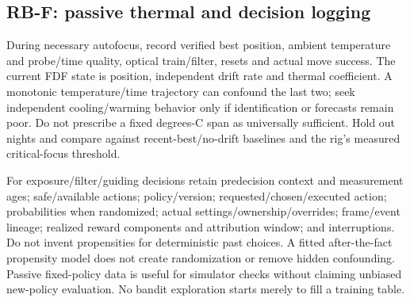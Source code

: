 \documentclass[11pt,a4paper]{article}
\begin{document}
\subsection{RB-F: passive thermal and decision logging}
During necessary autofocus, record verified best position, ambient temperature
and probe/time quality, optical train/filter, resets and actual move success.
The current FDF state is position, independent drift rate and thermal
coefficient. A monotonic temperature/time trajectory can confound the last two;
seek independent cooling/warming behavior only if identification or forecasts
remain poor. Do not prescribe a fixed degrees-C span as universally sufficient.
Hold out nights and compare against recent-best/no-drift baselines and the
rig's measured critical-focus threshold.

For exposure/filter/guiding decisions retain predecision context and measurement
ages; safe/available actions; policy/version; requested/chosen/executed action;
probabilities when randomized; actual settings/ownership/overrides; frame/event
lineage; realized reward components and attribution window; and interruptions.
Do not invent propensities for deterministic past choices. A fitted after-the-fact
propensity model does not create randomization or remove hidden confounding.
Passive fixed-policy data is useful for simulator checks without claiming
unbiased new-policy evaluation. No bandit exploration starts merely to fill a
training table.
\end{document}
